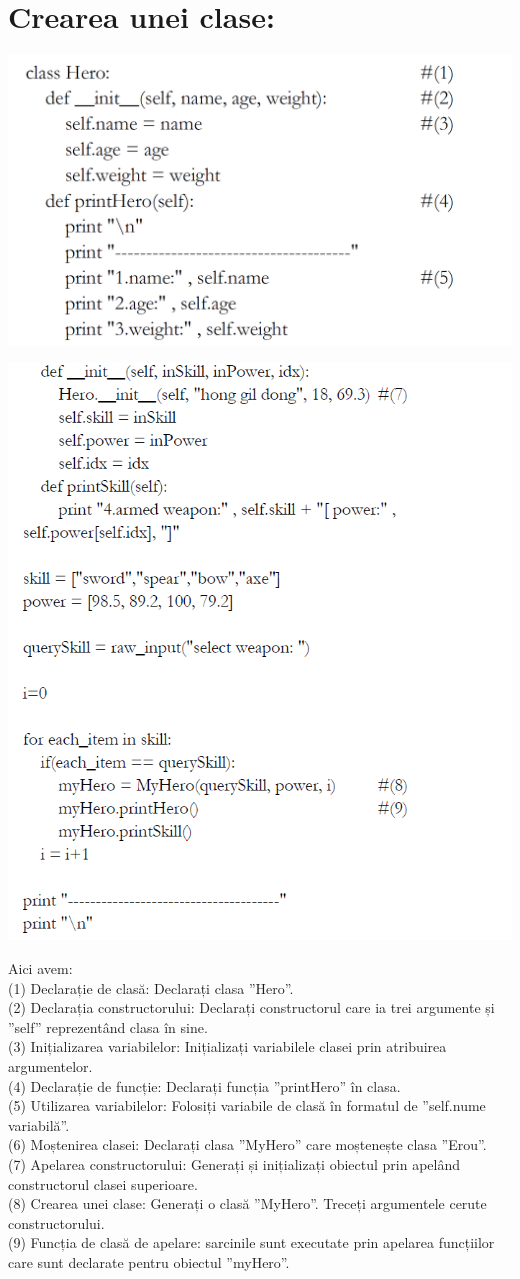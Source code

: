 \documentclass[oneside,20pt]{article}          %
\begin{document}
\section{Crearea unei clase:}
\begin{center}
\includegraphics[height=4 cm]{7.png}
\end{center}
\begin{center}
\includegraphics[height=8 cm]{8.png}
\end{center}
Aici avem:\\
(1) Declarație de clasă: Declarați clasa ”Hero”.\\
(2) Declarația constructorului: Declarați constructorul care ia trei argumente și ”self” reprezentând clasa în sine.\\
(3) Inițializarea variabilelor: Inițializați variabilele clasei prin atribuirea argumentelor.\\
(4) Declarație de funcție: Declarați funcția ”printHero” în clasa.\\
(5) Utilizarea variabilelor: Folosiți variabile de clasă în formatul de
”self.nume variabilă”.\\
(6) Moștenirea clasei: Declarați clasa ”MyHero” care moștenește
clasa ”Erou”.\\
(7) Apelarea constructorului: Generați și inițializați obiectul prin
apelând constructorul clasei superioare.\\
(8) Crearea unei clase: Generați o clasă ”MyHero”. Treceți argumentele cerute constructorului.\\
(9) Funcția de clasă de apelare: sarcinile sunt executate prin apelarea funcțiilor care sunt declarate pentru obiectul ”myHero”.\\
\end{document}
